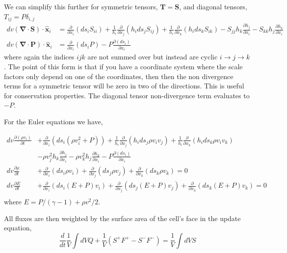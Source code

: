 \documentclass{article}
\newcommand{\pderiv}[1]{\frac{\partial }{\partial #1}}
\newcommand{\ppderiv}[2]{\frac{\partial #1}{\partial #2}}
\newcommand{\del}{\mathbf{\nabla}}
\begin{document}
We can simplify this further for symmetric tensors, $\mathbf{T} = \mathbf{S}$, and diagonal tensors, $T_{ij} = P \delta_{i,j}$
\begin{align}
dv \left(\del \cdot \mathbf{S} \right)\cdot \hat{\mathbf{x}}_i &= \pderiv{x_i} \left( ds_i S_{ii} \right)  +  \frac{1}{h_i}\pderiv{x_j} \left( h_i ds_j S_{ij} \right) +  \frac{1}{h_i} \pderiv{x_k} \left( h_i ds_k S_{ik} \right) - S_{jj} h_k \ppderiv{h_j}{x_i} - S_{kk} h_j  \ppderiv{h_k}{x_i}  \\
dv \left(\del \cdot \mathbf{P} \right)\cdot \hat{\mathbf{x}}_i  &= \pderiv{x_i} \left( ds_i P \right)   -  P \ppderiv{(ds_i)}{x_i}  
\end{align}
where again the indices $ijk$ are not summed over but instead are cyclic $i \rightarrow j \rightarrow k$.
The point of this form is that if you have a coordinate system where the scale factors only depend on one of the coordinates, then then the non divergence terms for a symmetric tensor will be zero in two of the directions. This is useful for conservation properties. 
The diagonal tensor non-divergence term evaluates to $-P$.



For the Euler equations we have,

\begin{align}
dv \ppderiv{(\rho v_i)}{t} &+ \pderiv{x_i} \left( ds_i (\rho v_i^2 + P) \right) + \frac{1}{h_i} \pderiv{x_j} \left(h_i ds_j  \rho v_i v_j \right) + \frac{1}{h_i} \pderiv{x_k} \left(h_i ds_k \rho v_i v_k \right)  \nonumber \\ 
&- \rho v_j^2  h_k \ppderiv{h_j}{x_i} - \rho v_k^2 h_j \ppderiv{h_k}{x_i} - P \ppderiv{(ds_i)}{x_i} \\ 
dv \ppderiv{\rho}{t} &+ \pderiv{x_i} \left( ds_i \rho v_i \right) +\pderiv{x_j} \left( ds_j \rho v_j \right) +\pderiv{x_k} \left( ds_k \rho v_k \right)  = 0 \\
dv \ppderiv{E}{t} &+ \pderiv{x_i} \left( ds_i (E + P) v_i \right) +\pderiv{x_j} \left( ds_j (E + P)  v_j \right) +\pderiv{x_k} \left( ds_k (E + P) v_k \right)  = 0 \\
\end{align}
where $E = P/(\gamma-1) + \rho v^2/2$.

All fluxes are then weighted by the surface area of the cell's face in the update equation,
\begin{equation}
\frac{d}{dt} \frac{1}{V} \int dV Q  + \frac{1}{V} \left( S^+ F^+ - S^- F^- \right) = \frac{1}{V} \int dV S
\end{equation}
\end{document}
